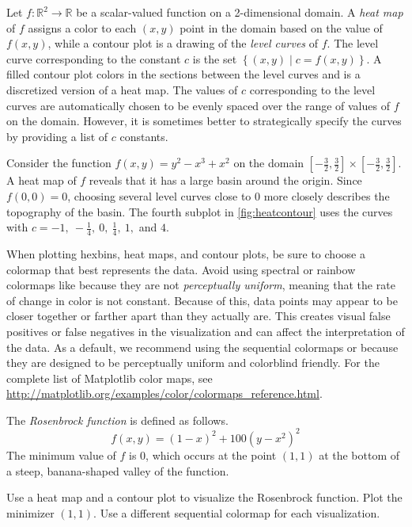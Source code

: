 Let $f:\mathbb{R}^2\rightarrow\mathbb{R}$ be a scalar-valued function on a 2-dimensional domain.
A \emph{heat map} of $f$ assigns a color to each $(x,y)$ point in the domain based on the value of $f(x,y)$, while a contour plot is a drawing of the \emph{level curves} of $f$.
The level curve corresponding to the constant $c$ is the set $\left\{(x,y)\mid c = f(x,y)\right\}$.
A filled contour plot colors in the sections between the level curves and is a discretized version of a heat map.
The values of $c$ corresponding to the level curves are automatically chosen to be evenly spaced over the range of values of $f$ on the domain.
However, it is sometimes better to strategically specify the curves by providing a list of $c$ constants.

Consider the function $f(x,y) = y^2 - x^3 + x^2$ on the domain $[-\frac{3}{2}, \frac{3}{2}] \times [-\frac{3}{2}, \frac{3}{2}]$.
A heat map of $f$ reveals that it has a large basin around the origin.
Since $f(0,0) = 0$, choosing several level curves close to $0$ more closely describes the topography of the basin.
The fourth subplot in \ref{fig:heatcontour} uses the curves with $c = -1,\ -\frac{1}{4},\ 0,\ \frac{1}{4},\ 1,$ and $4$.

When plotting hexbins, heat maps, and contour plots, be sure to choose a colormap that best represents the data.
Avoid using spectral or rainbow colormaps like  because they are not \emph{perceptually uniform}, meaning that the rate of change in color is not constant.
Because of this, data points may appear to be closer together or farther apart than they actually are.
This creates visual false positives or false negatives in the visualization and can affect the interpretation of the data.
As a default, we recommend using the sequential colormaps  or  because they are designed to be perceptually uniform and colorblind friendly.
For the complete list of Matplotlib color maps, see \url{http://matplotlib.org/examples/color/colormaps_reference.html}.

\begin{problem} %
The \emph{Rosenbrock function} is defined as follows.
\[f(x,y) = (1-x)^2 + 100(y-x^2)^2\]
The minimum value of $f$ is $0$, which occurs at the point $(1,1)$ at the bottom of a steep, banana-shaped valley of the function.

Use a heat map and a contour plot to visualize the Rosenbrock function.
Plot the minimizer $(1,1)$.
Use a different sequential colormap for each visualization.
\end{problem}

